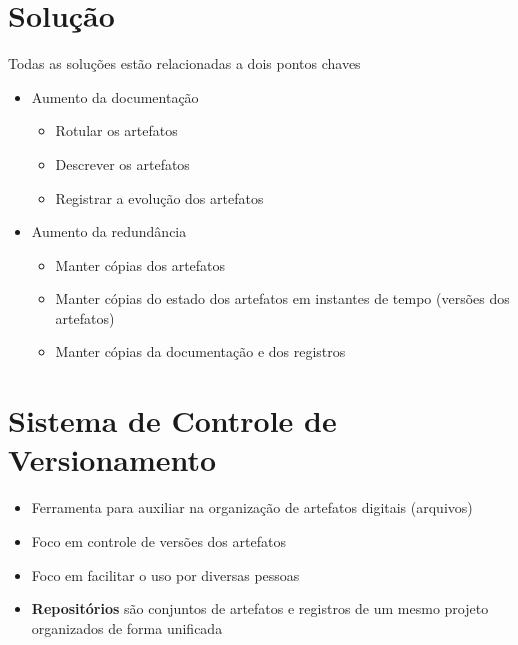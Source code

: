 \documentclass{beamer}
\newenvironment{slide}{\begin{frame}{\insertsection}}{\end{frame}}
\begin{document}
\section{Solução}
\begin{slide}
    Todas as soluções estão relacionadas a dois pontos chaves
    \begin{itemize}
        \pause
        \item Aumento da documentação
        \begin{itemize}
            \pause
            \item Rotular os artefatos
            \pause
            \item Descrever os artefatos
            \pause
            \item Registrar a evolução dos artefatos
        \end{itemize}
        \pause
        \item Aumento da redundância
        \begin{itemize}
            \pause
            \item Manter cópias dos artefatos
            \pause
            \item Manter cópias do estado dos artefatos em instantes de tempo
                \pause (versões dos artefatos)
            \pause
            \item Manter cópias da documentação e dos registros
        \end{itemize}
    \end{itemize}
\end{slide}

\section{Sistema de Controle de Versionamento}
\begin{slide}
    \begin{itemize}
        \item Ferramenta para auxiliar na organização de artefatos digitais
            \pause (arquivos)
        \pause
        \item Foco em controle de versões dos artefatos
        \pause
        \item Foco em facilitar o uso por diversas pessoas
        \pause
        \item \textbf{Repositórios} são conjuntos de artefatos e registros de um
            mesmo projeto organizados de forma unificada
    \end{itemize}
\end{slide}
\end{document}
